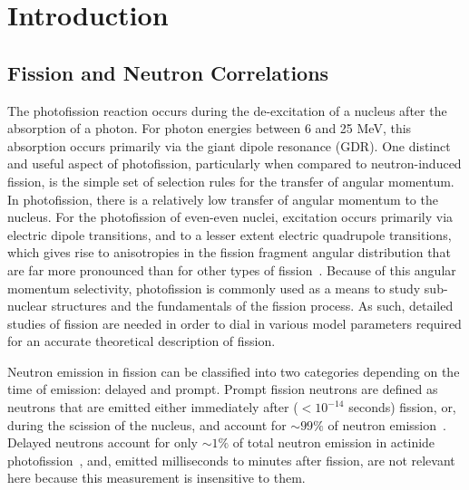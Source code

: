 \documentclass[%
 reprint,
 calc,
 amsmath,amssymb,
 aps,
 nofootinbib,
 linenumbers
]{revtex4-1}
\begin{document}
\maketitle

\tableofcontents
\linenumbers

\section{\label{sec:level1}Introduction}

\subsection{Fission and Neutron Correlations}
The photofission reaction occurs during the de-excitation of a nucleus after the absorption of a photon.
For photon energies between 6 and 25 MeV, this absorption occurs primarily via the giant dipole resonance (GDR).
One distinct and useful aspect of photofission, particularly when compared to neutron-induced fission, is the simple set of selection rules for the transfer of angular momentum.
In photofission, there is a relatively low transfer of angular momentum to the nucleus.
For the photofission of even-even nuclei, excitation occurs primarily via electric dipole transitions, and to a lesser extent electric quadrupole transitions, which gives rise to anisotropies in the fission fragment angular distribution that are far more pronounced than for other types of fission~\cite{1977FragAss}.
Because of this angular momentum selectivity, photofission is commonly used as a means to study sub-nuclear structures and the fundamentals of the fission process.
As such, detailed studies of fission are needed in order to dial in various model parameters required for an accurate theoretical description of fission.

Neutron emission in fission can be classified into two categories depending on the time of emission: delayed and prompt.
Prompt fission neutrons are defined as neutrons that are emitted either immediately after ($<10^{-14}$ seconds) fission, or, during the scission of the nucleus, and account for $\sim99\%$ of neutron emission~\cite{Caldwell2017DelayedNs}.
Delayed neutrons account for only $\sim1\%$ of total neutron emission in actinide photofission~\cite{Caldwell2017DelayedNs}, and, emitted milliseconds to minutes after fission, are not relevant here because this measurement is insensitive to them.
\end{document}

